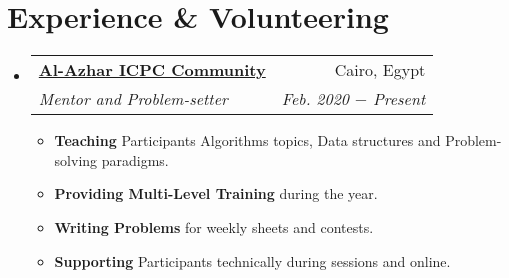 \documentclass[letterpaper, 11pt]{article}
\makeatletter
\newcommand{\experienceItem}[4] {
  \vspace{-1pt}\item
  \begin{tabular*}{0.97\textwidth}[t]{l@{\extracolsep{\fill}}r}
    \textbf{#1} & #2 \\
    \textit{\small #3} & \textit{\small #4} \\
  \end{tabular*}\vspace{-5pt}
}
\newcommand{\experienceSubItem}[2] {\item\small{\textbf{#1}{#2 \vspace{-2pt}}}}
\makeatother
\begin{document}
\section{Experience \& Volunteering}
\begin{itemize}[leftmargin=*]
  \experienceItem{\faIcon{code} \href{https://sites.google.com/view/azharicpc/home}{Al-Azhar ICPC Community}}{Cairo, Egypt}{Mentor and Problem-setter}{Feb. 2020 $-$ Present}
  \begin{itemize}
    \experienceSubItem{Teaching}{ Participants Algorithms topics, Data structures and Problem-solving paradigms.}
    \experienceSubItem{Providing Multi-Level Training}{ during the year.}
    \experienceSubItem{Writing Problems}{ for weekly sheets and contests.}
    \experienceSubItem{Supporting}{ Participants technically during sessions and online.}
  \end{itemize}\vspace{-5pt}
\end{itemize}

\end{document}
